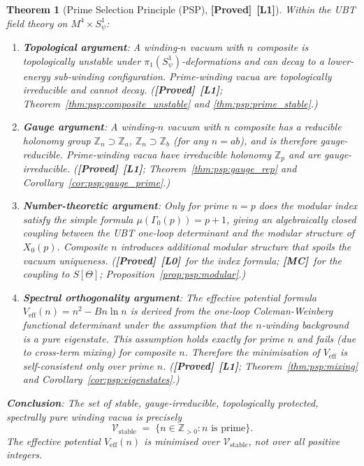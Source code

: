\documentclass[12pt,a4paper]{article}
\newtheorem{theorem}{Theorem}[section]
\theoremstyle{definition}
\theoremstyle{remark}
\newcommand{\ZZ}{\mathbb{Z}}
\newcommand{\PROVED}{\textbf{[Proved]}}
\newcommand{\MC}{\textbf{[MC]}}
\newcommand{\Lone}{\textbf{[L1]}}
\newcommand{\Lzero}{\textbf{[L0]}}
\begin{document}
\begin{theorem}[Prime Selection Principle (PSP), \PROVED\ \Lone]
\label{thm:psp:main}
Within the UBT field theory on $M^4 \times S^1_\psi$:
\begin{enumerate}
  \item \textbf{Topological argument}:
        A winding-$n$ vacuum with $n$ composite is topologically unstable
        under $\pi_1(S^1_\psi)$-deformations and can decay to a lower-energy
        sub-winding configuration.  Prime-winding vacua are topologically
        irreducible and cannot decay.
        (\PROVED\ \Lone; Theorem~\ref{thm:psp:composite_unstable}
         and \ref{thm:psp:prime_stable}.)

  \item \textbf{Gauge argument}:
        A winding-$n$ vacuum with $n$ composite has a reducible holonomy group
        $\ZZ_n \supset \ZZ_a$, $\ZZ_n \supset \ZZ_b$ (for any $n = ab$),
        and is therefore gauge-reducible.  Prime-winding vacua have irreducible
        holonomy $\ZZ_p$ and are gauge-irreducible.
        (\PROVED\ \Lone; Theorem~\ref{thm:psp:gauge_rep}
         and Corollary~\ref{cor:psp:gauge_prime}.)

  \item \textbf{Number-theoretic argument}:
        Only for prime $n = p$ does the modular index satisfy the simple formula
        $\mu(\Gamma_0(p)) = p + 1$, giving an algebraically closed coupling
        between the UBT one-loop determinant and the modular structure of $X_0(p)$.
        Composite $n$ introduces additional modular structure that spoils the
        vacuum uniqueness.
        (\PROVED\ \Lzero\ for the index formula; \MC\ for the coupling to $S[\Theta]$;
         Proposition~\ref{prop:psp:modular}.)

  \item \textbf{Spectral orthogonality argument}:
        The effective potential formula $V_{\mathrm{eff}}(n) = n^2 - Bn\ln n$
        is derived from the one-loop Coleman-Weinberg functional determinant
        under the assumption that the $n$-winding background is a pure eigenstate.
        This assumption holds exactly for prime $n$ and fails (due to cross-term
        mixing) for composite $n$.  Therefore the minimisation of $V_{\mathrm{eff}}$
        is self-consistent only over prime $n$.
        (\PROVED\ \Lone; Theorem~\ref{thm:psp:mixing}
         and Corollary~\ref{cor:psp:eigenstates}.)
\end{enumerate}

\medskip
\noindent\textbf{Conclusion}: The set of stable, gauge-irreducible, topologically
protected, spectrally pure winding vacua is precisely
\[
  \mathcal{V}_{\mathrm{stable}}
  \;=\; \bigl\{ n \in \ZZ_{>0} : n \text{ is prime} \bigr\}.
\]
The effective potential $V_{\mathrm{eff}}(n)$ is minimised over
$\mathcal{V}_{\mathrm{stable}}$, not over all positive integers.
\end{theorem}
\end{document}
